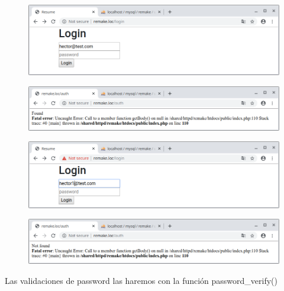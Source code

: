 \documentclass{article}
\begin{document}
\begin{figure}[h!]
  \centering
  \includegraphics[scale=0.5]{./Pictures/198_login.png}
\end{figure}

\begin{figure}[h!]
  \centering
  \includegraphics[scale=0.5]{./Pictures/199_login_found.png}
\end{figure}

\begin{figure}[h!]
  \centering
  \includegraphics[scale=0.5]{./Pictures/200_login.png}
\end{figure}

\begin{figure}[h!]
  \centering
  \includegraphics[scale=0.5]{./Pictures/201_login_not_found.png}
\end{figure}

Las validaciones de password las haremos con la función password\_verify()
\end{document}
